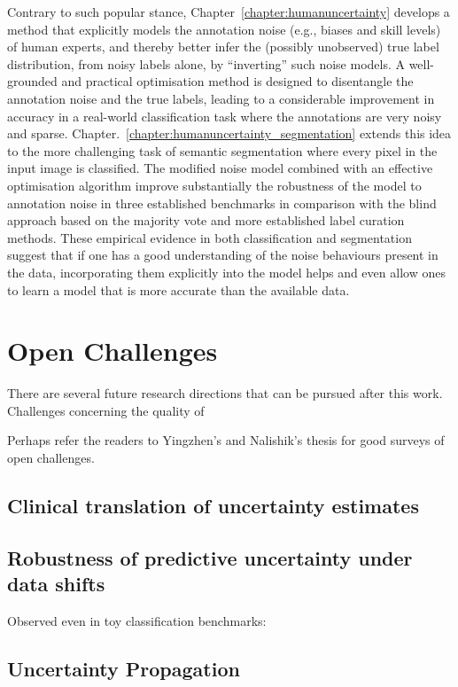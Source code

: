 Contrary to such popular stance, Chapter~\ref{chapter:humanuncertainty} develops a method that explicitly models the annotation noise  (e.g., biases and skill levels) of human experts, and thereby better infer the (possibly unobserved) true label distribution, from noisy labels alone, by ``inverting'' such noise models. A well-grounded and practical optimisation method is designed to disentangle the annotation noise and the true labels, leading to a considerable improvement in accuracy in a real-world classification task where the annotations are very noisy and sparse. Chapter.~\ref{chapter:humanuncertainty_segmentation} extends this idea to the more challenging task of semantic segmentation where every pixel in the input image is classified. The modified noise model combined with an effective optimisation algorithm improve substantially the robustness of the model to annotation noise in three established benchmarks in comparison with the blind approach based on the majority vote and more established label curation methods. These empirical evidence in both classification and segmentation suggest that if one has a good understanding of the noise behaviours present in the data, incorporating them explicitly into the model helps and even allow ones to learn a model that is more accurate than the available data. 


\section{Open Challenges}
There are several future research directions that can be pursued after this work. Challenges concerning the quality of 

Perhaps refer the readers to Yingzhen's and Nalishik's thesis for good surveys of open challenges. 


\subsection{Clinical translation of uncertainty estimates}

\subsection{Robustness of predictive uncertainty under data shifts}
Observed even in toy classification benchmarks: \cite{ovadia2019can}


\subsection{Uncertainty Propagation}

